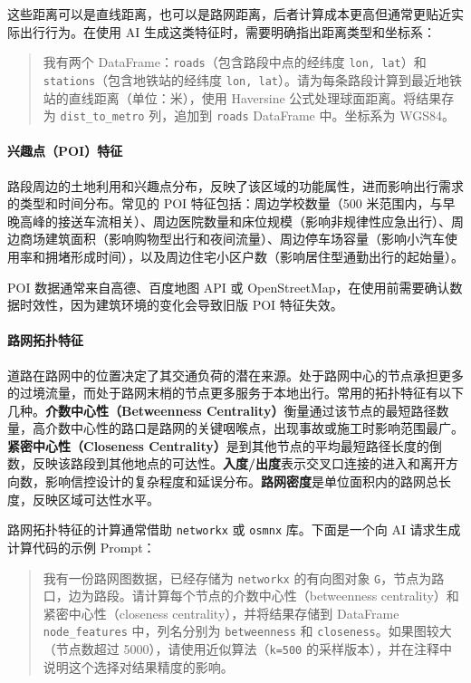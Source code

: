 这些距离可以是直线距离，也可以是路网距离，后者计算成本更高但通常更贴近实际出行行为。在使用 AI 生成这类特征时，需要明确指出距离类型和坐标系：

\begin{quote}
我有两个 DataFrame：\texttt{roads}（包含路段中点的经纬度 \texttt{lon, lat}）和 \texttt{stations}（包含地铁站的经纬度 \texttt{lon, lat}）。请为每条路段计算到最近地铁站的直线距离（单位：米），使用 Haversine 公式处理球面距离。将结果存为 \texttt{dist\_to\_metro} 列，追加到 \texttt{roads} DataFrame 中。坐标系为 WGS84。
\end{quote}

\paragraph{兴趣点（POI）特征}

路段周边的土地利用和兴趣点分布，反映了该区域的功能属性，进而影响出行需求的类型和时间分布。常见的 POI 特征包括：周边学校数量（500 米范围内，与早晚高峰的接送车流相关）、周边医院数量和床位规模（影响非规律性应急出行）、周边商场建筑面积（影响购物型出行和夜间流量）、周边停车场容量（影响小汽车使用率和拥堵形成时间），以及周边住宅小区户数（影响居住型通勤出行的起始量）。

POI 数据通常来自高德、百度地图 API 或 OpenStreetMap，在使用前需要确认数据时效性，因为建筑环境的变化会导致旧版 POI 特征失效。

\paragraph{路网拓扑特征}

道路在路网中的位置决定了其交通负荷的潜在来源。处于路网中心的节点承担更多的过境流量，而处于路网末梢的节点更多服务于本地出行。常用的拓扑特征有以下几种。\textbf{介数中心性（Betweenness Centrality）}衡量通过该节点的最短路径数量，高介数中心性的路口是路网的关键咽喉点，出现事故或施工时影响范围最广。\textbf{紧密中心性（Closeness Centrality）}是到其他节点的平均最短路径长度的倒数，反映该路段到其他地点的可达性。\textbf{入度/出度}表示交叉口连接的进入和离开方向数，影响信控设计的复杂程度和延误分布。\textbf{路网密度}是单位面积内的路网总长度，反映区域可达性水平。

路网拓扑特征的计算通常借助 \texttt{networkx} 或 \texttt{osmnx} 库。下面是一个向 AI 请求生成计算代码的示例 Prompt：

\begin{quote}
我有一份路网图数据，已经存储为 \texttt{networkx} 的有向图对象 \texttt{G}，节点为路口，边为路段。请计算每个节点的介数中心性（betweenness centrality）和紧密中心性（closeness centrality），并将结果存储到 DataFrame \texttt{node\_features} 中，列名分别为 \texttt{betweenness} 和 \texttt{closeness}。如果图较大（节点数超过 5000），请使用近似算法（\texttt{k=500} 的采样版本），并在注释中说明这个选择对结果精度的影响。
\end{quote}

